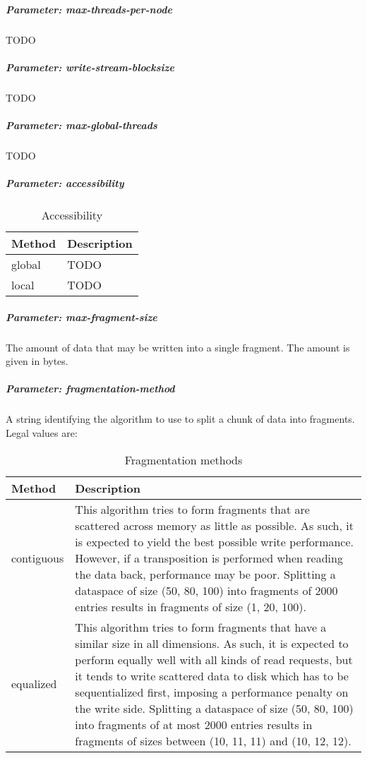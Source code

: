 \subparagraph{Parameter: max-threads-per-node}
TODO

\subparagraph{Parameter: write-stream-blocksize}
TODO

\subparagraph{Parameter: max-global-threads}
TODO

\subparagraph{Parameter: accessibility}

\begin{preserve}
\begin{table}[!ht]
  \begin{center}
    \begin{tabularx}{\textwidth}{lX}
      Method & Description \\ 
      \hline
      global & TODO        \\ 
      local  & TODO        \\ 
    \end{tabularx}
  \end{center}
  \caption{Accessibility}%
  \label{tab:accessibility}
\end{table}
\end{preserve}

\subparagraph{Parameter: max-fragment-size}
The amount of data that may be written into a single fragment. 
The amount is given in bytes.

\subparagraph{Parameter: fragmentation-method}
A string identifying the algorithm to use to split a chunk of data into fragments. 
Legal values are:

\begin{preserve}
\begin{table}[!ht]
  \begin{center}
    \begin{tabularx}{\textwidth}{lX}
      Method     & Description \\
      \hline
      contiguous  & This algorithm tries to form fragments that are scattered across memory as little as possible. As such, it is expected to yield the best possible write performance. 
      However, if a transposition is performed when reading the data back, performance may be poor.
      Splitting a dataspace of size (50, 80, 100) into fragments of 2000 entries results in fragments of size (1, 20, 100). \\
      equalized   & This algorithm tries to form fragments that have a similar size in all dimensions. As such, it is expected to perform equally well with all kinds of read requests, but it tends to write scattered data to disk which has to be sequentialized first, imposing a performance penalty on the write side.
      Splitting a dataspace of size (50, 80, 100) into fragments of at most 2000 entries results in fragments of sizes between (10, 11, 11) and (10, 12, 12). \\
    \end{tabularx}
  \end{center}
  \caption{Fragmentation methods}%
  \label{tab:frag_methods}
\end{table}
\end{preserve}


